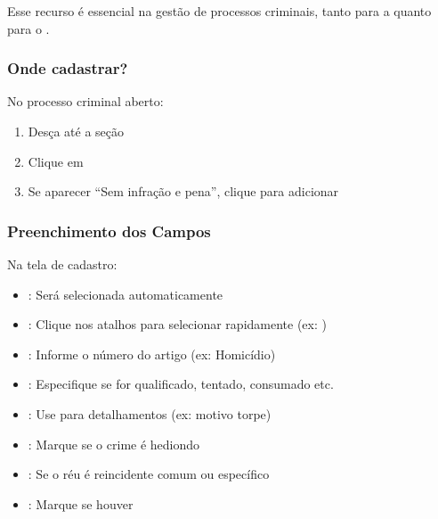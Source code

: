 \documentclass[letterpaper,10pt,brazil]{sphinxmanual}
\begin{document}
\sphinxAtStartPar
Esse recurso é essencial na gestão de processos criminais, tanto para a  quanto para o .


\subsubsection{Onde cadastrar?}
\label{\detokenize{projud_52_cadastroinfracoes:onde-cadastrar}}
\sphinxAtStartPar
No processo criminal aberto:
\begin{enumerate}
%
\item {} 
\sphinxAtStartPar
Desça até a seção 

\item {} 
\sphinxAtStartPar
Clique em 

\item {} 
\sphinxAtStartPar
Se aparecer “Sem infração e pena”, clique para adicionar

\end{enumerate}


\subsubsection{Preenchimento dos Campos}
\label{\detokenize{projud_52_cadastroinfracoes:preenchimento-dos-campos}}
\sphinxAtStartPar
Na tela de cadastro:
\begin{itemize}
\item {} 
\sphinxAtStartPar
{}: Será selecionada automaticamente

\item {} 
\sphinxAtStartPar
{}: Clique nos atalhos para selecionar rapidamente (ex: )

\item {} 
\sphinxAtStartPar
{}: Informe o número do artigo (ex:  \textendash{} Homicídio)

\item {} 
\sphinxAtStartPar
{}: Especifique se for qualificado, tentado, consumado etc.

\item {} 
\sphinxAtStartPar
{}: Use para detalhamentos (ex: motivo torpe)

\item {} 
\sphinxAtStartPar
{}: Marque se o crime é hediondo

\item {} 
\sphinxAtStartPar
{}: Se o réu é reincidente comum ou específico

\item {} 
\sphinxAtStartPar
{}: Marque se houver

\end{itemize}
\end{document}
